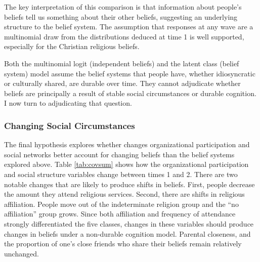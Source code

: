 \documentclass[12pt,]{article}
\begin{document}
The key interpretation of this comparison is that information about people's beliefs tell us something about their other beliefs, suggesting an underlying structure to the belief system. The assumption that responses at any wave are a multinomial draw from the distributions deduced at time 1 is well supported, especially for the Christian religious beliefs.

Both the multinomial logit (independent beliefs) and the latent class (belief system) model assume the belief systems that people have, whether idiosyncratic or culturally shared, are durable over time. They cannot adjudicate whether beliefs are principally a result of stable social circumstances or durable cognition. I now turn to adjudicating that question.

\hypertarget{changing-social-circumstances}{%
\subsubsection{Changing Social Circumstances}\label{changing-social-circumstances}}

The final hypothesis explores whether changes organizational participation and social networks better account for changing beliefs than the belief systems explored above. Table \ref{tab:covsum} shows how the organizational participation and social structure variables change between times 1 and 2. There are two notable changes that are likely to produce shifts in beliefs. First, people decrease the amount they attend religious services. Second, there are shifts in religious affiliation. People move out of the indeterminate religion group and the ``no affiliation'' group grows. Since both affiliation and frequency of attendance strongly differentiated the five classes, changes in these variables should produce changes in beliefs under a non-durable cognition model. Parental closeness, and the proportion of one's close friends who share their beliefs remain relatively unchanged.
\end{document}
